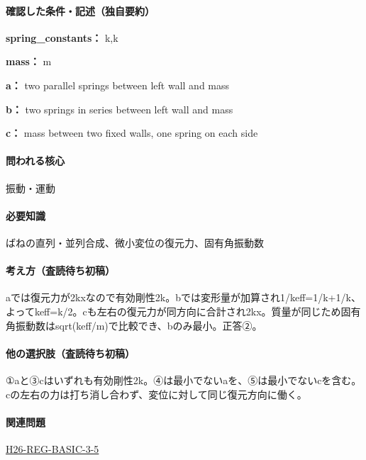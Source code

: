 \paragraph{確認した条件・記述（独自要約）}\mbox{}\par

\noindent\textbf{spring\_constants：} k,k\par

\noindent\textbf{mass：} m\par

\noindent\textbf{a：} two parallel springs between left wall and mass\par

\noindent\textbf{b：} two springs in series between left wall and mass\par

\noindent\textbf{c：} mass between two fixed walls, one spring on each side\par

\paragraph{問われる核心} 振動・運動

\paragraph{必要知識} ばねの直列・並列合成、微小変位の復元力、固有角振動数

\paragraph{考え方（査読待ち初稿）} aでは復元力が2kxなので有効剛性2k。bでは変形量が加算され1/keff=\allowbreak{}1/k+1/k、よってkeff=\allowbreak{}k/2。cも左右の復元力が同方向に合計され2kx。質量が同じため固有角振動数はsqrt(keff/m)で比較でき、bのみ最小。正答②。

\paragraph{他の選択肢（査読待ち初稿）} ①aと③cはいずれも有効剛性2k。④は最小でないaを、⑤は最小でないcを含む。cの左右の力は打ち消し合わず、変位に対して同じ復元方向に働く。

\paragraph{関連問題} \hyperref[q:h26-reg-basic-3-5]{H26-REG-BASIC-3-5}

